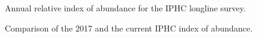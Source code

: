 \documentclass[
]{scrartcl}
\begin{document}
\begin{figure}


\caption{\label{fig-IPHC_index}Annual relative index of abundance for
the IPHC longline survey.}

\end{figure}%

\begin{figure}


\caption{\label{fig-IPHC_comparison}Comparison of the 2017 and the
current IPHC index of abundance.}

\end{figure}%
\end{document}
